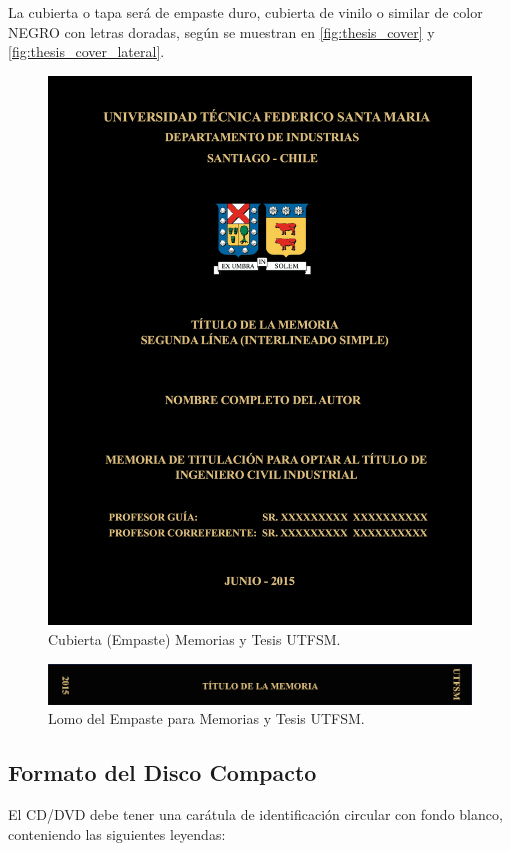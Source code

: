 La cubierta o tapa será de empaste duro, cubierta de vinilo o similar de color NEGRO con letras doradas, según se muestran en \autoref{fig:thesis_cover} y \autoref{fig:thesis_cover_lateral}.
\begin{figure}[ht!]
\centering
\includegraphics[width=.7\textwidth]{figures/thesis_cover.png}
\caption{Cubierta (Empaste) Memorias y Tesis UTFSM.}
\label{fig:thesis_cover}
\end{figure}

\begin{figure}[ht!]
\centering
\includegraphics[width=.7\textwidth]{figures/thesis_cover_lateral.png}
\caption{Lomo del Empaste para Memorias y Tesis UTFSM.}
\label{fig:thesis_cover_lateral}
\end{figure}

\subsection{Formato del Disco Compacto}

El CD/DVD debe tener una carátula de identificación circular con fondo blanco, conteniendo las siguientes leyendas:


